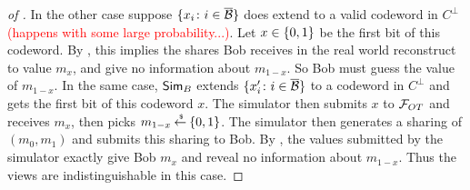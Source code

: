 \begin{proof}[of ]
	In the other case suppose $\{x_i \colon i \in \overline{{\mathcal B}} \}$ does extend to a valid codeword in $C^\perp$ \textcolor{red}{(happens with some large probability...)}.
	Let $x \in {\{0,1\}}$ be the first bit of this codeword.
	By , this implies the shares Bob receives in the real world reconstruct to value $m_x$, and give no information about $m_{1-x}$.
	So Bob must guess the value of $m_{1-x}$.
	In the same case, $\mathsf{Sim}_B$ extends $\{ x_i' \colon i \in \overline{{\mathcal B}} \}$ to a codeword in $C^\perp$ and gets the first bit of this codeword $x$.
	The simulator then submits $x$ to ${\mathcal F}_{OT}$ and receives $m_x$, then picks $m_{1-x} \mathbin{\stackrel{\mbox{\,\tiny \$}}{\gets}} {\{0,1\}}$.
	The simulator then generates a sharing of $(m_0, m_1)$ and submits this sharing to Bob.
	By , the values submitted by the simulator exactly give Bob $m_x$ and reveal no information about $m_{1-x}$.
	Thus the views are indistinguishable in this case.
\end{proof}





